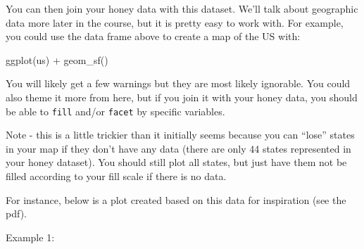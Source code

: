 \documentclass[
]{article}
\newenvironment{Shaded}{\begin{snugshade}}{\end{snugshade}}
\newcommand{\FunctionTok}[1]{\textcolor[rgb]{0.00,0.00,0.00}{#1}}
\newcommand{\NormalTok}[1]{#1}
\newcommand{\SpecialCharTok}[1]{\textcolor[rgb]{0.00,0.00,0.00}{#1}}
\begin{document}
You can then join your honey data with this dataset. We'll talk about
geographic data more later in the course, but it is pretty easy to work
with. For example, you could use the data frame above to create a map of
the US with:

\begin{Shaded}
\begin{Highlighting}[]
\FunctionTok{ggplot}\NormalTok{(us) }\SpecialCharTok{+}
  \FunctionTok{geom\_sf}\NormalTok{()}
\end{Highlighting}
\end{Shaded}

You will likely get a few warnings but they are most likely ignorable.
You could also theme it more from here, but if you join it with your
honey data, you should be able to \texttt{fill} and/or \texttt{facet} by
specific variables.

Note - this is a little trickier than it initially seems because you can
``lose'' states in your map if they don't have any data (there are only
44 states represented in your honey dataset). You should still plot all
states, but just have them not be filled according to your fill scale if
there is no data.

For instance, below is a plot created based on this data for inspiration
(see the pdf).

Example 1:
\end{document}

